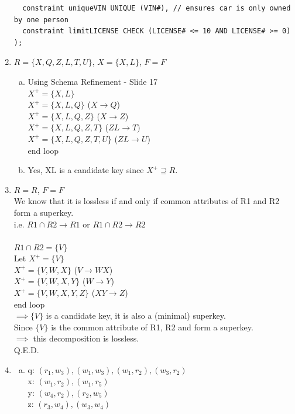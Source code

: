 \documentclass[11pt, oneside]{article}   	%
\begin{document}
\begin{enumerate}
\begin{verbatim}
  constraint uniqueVIN UNIQUE (VIN#), // ensures car is only owned by one person
  constraint limitLICENSE CHECK (LICENSE# <= 10 AND LICENSE# >= 0)
);
\end{verbatim}
\item $R = \{X, Q, Z, L, T, U\}$, $X = \{X, L\}$, $F = F$
\begin{enumerate}[(a)]
\item Using Schema Refinement - Slide 17
\\ $X^+ = \{X, L\}$
\\ $X^+ = \{X, L, Q\}$ ($X \rightarrow Q$)
\\ $X^+ = \{X, L, Q, Z\}$ ($X \rightarrow Z$)
\\ $X^+ = \{X, L, Q, Z, T\}$ ($ZL \rightarrow T$)
\\ $X^+ = \{X, L, Q, Z, T, U\}$ ($ZL \rightarrow U$)
\\ end loop
\item Yes, XL is a candidate key since $X^+ \supseteq R$.
\end{enumerate}
\item $R = R$, $F = F$
\\ We know that it is lossless if and only if common attributes of R1 and R2 form a superkey.
\\ i.e. $R1 \cap R2 \rightarrow R1$ or $R1 \cap R2 \rightarrow R2$
\\ \\ $R1 \cap R2 = \{V\}$
\\ Let $X^+ = \{V\}$
\\ $X^+ = \{V, W, X\}$ ($V \rightarrow WX$)
\\ $X^+ = \{V, W, X, Y\}$ ($W \rightarrow Y$)
\\ $X^+ = \{V, W, X, Y, Z\}$ ($XY \rightarrow Z$)
\\ end loop
\\ $\implies \{V\}$ is a candidate key, it is also a (minimal) superkey.
\\ Since $\{V\}$ is the common attribute of R1, R2 and form a superkey. 
\\ $\implies$ this decomposition is lossless.
\\ Q.E.D.
\item
\begin{enumerate}[(a)]
\item q: $(r_1, w_3), (w_1, w_3), (w_1, r_2), (w_3, r_2)$
\\ x: $(w_1, r_2), (w_1, r_5)$
\\ y: $(w_4, r_2), (r_2, w_5)$
\\ z: $(r_3, w_4), (w_3, w_4) $

\end{enumerate}
\end{enumerate}
\end{document}
